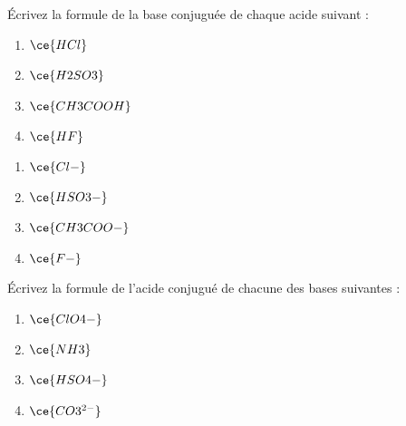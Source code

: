 \documentclass[
  11pt,
  french,
  a4paper,
  openany]{book}
\providecommand{\tightlist}{%
  \setlength{\itemsep}{0pt}\setlength{\parskip}{0pt}}
\begin{document}
\begin{Exercise}

Écrivez la formule de la base conjuguée de chaque acide suivant :

\begin{enumerate}
\def\labelenumi{\alph{enumi}.}
\tightlist
\item
  \(\ce{HCl}\)
\item
  \(\ce{H2SO3}\)
\item
  \(\ce{CH3COOH}\)
\item
  \(\ce{HF}\)
\end{enumerate}


\end{Exercise}

\begin{Answer}

\begin{enumerate}
\def\labelenumi{\alph{enumi}.}
\tightlist
\item
  \(\ce{Cl-}\)
\item
  \(\ce{HSO3-}\)
\item
  \(\ce{CH3COO-}\)
\item
  \(\ce{F-}\)
\end{enumerate}


\end{Answer}

\begin{Exercise}

Écrivez la formule de l'acide conjugué de chacune des bases suivantes :

\begin{enumerate}
\def\labelenumi{\alph{enumi}.}
\tightlist
\item
  \(\ce{ClO4-}\)
\item
  \(\ce{NH3}\)
\item
  \(\ce{HSO4-}\)
\item
  \(\ce{CO3^{2-}}\)
\end{enumerate}


\end{Exercise}
\end{document}

